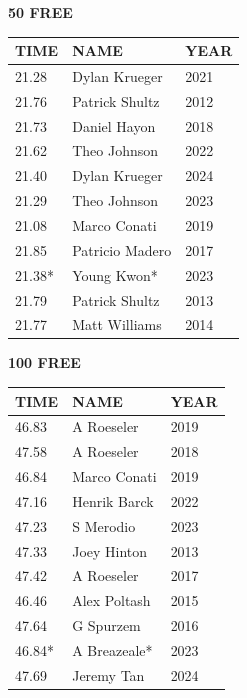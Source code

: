 \begin{table}[H]
\centering
\begin{minipage}[t]{0.48\textwidth}
\centering
\textbf{50 FREE}\\[0.1cm]
\begin{tabular}{@{}p{1.8cm}p{2.8cm}p{1.2cm}@{}}
\hline
    \textbf{TIME} & \textbf{NAME} & \textbf{YEAR} \\
\hline
    21.28 & Dylan Krueger & 2021 \\
    21.76 & Patrick Shultz & 2012 \\
    21.73 & Daniel Hayon & 2018 \\
    21.62 & Theo Johnson & 2022 \\
    21.40 & Dylan Krueger & 2024 \\
    21.29 & Theo Johnson & 2023 \\
    21.08 & Marco Conati & 2019 \\
    21.85 & Patricio Madero & 2017 \\
    21.38* & Young Kwon* & 2023 \\
    21.79 & Patrick Shultz & 2013 \\
    21.77 & Matt Williams & 2014 \\
\hline
\end{tabular}
\end{minipage}\hfill
\begin{minipage}[t]{0.48\textwidth}
\centering
\textbf{100 FREE}\\[0.1cm]
\begin{tabular}{@{}p{1.8cm}p{2.8cm}p{1.2cm}@{}}
\hline
    \textbf{TIME} & \textbf{NAME} & \textbf{YEAR} \\
\hline
    46.83 & A Roeseler & 2019 \\
    47.58 & A Roeseler & 2018 \\
    46.84 & Marco Conati & 2019 \\
    47.16 & Henrik Barck & 2022 \\
    47.23 & S Merodio & 2023 \\
    47.33 & Joey Hinton & 2013 \\
    47.42 & A Roeseler & 2017 \\
    46.46 & Alex Poltash & 2015 \\
    47.64 & G Spurzem & 2016 \\
    46.84* & A Breazeale* & 2023 \\
    47.69 & Jeremy Tan & 2024 \\
\hline
\end{tabular}
\end{minipage}
\end{table}

